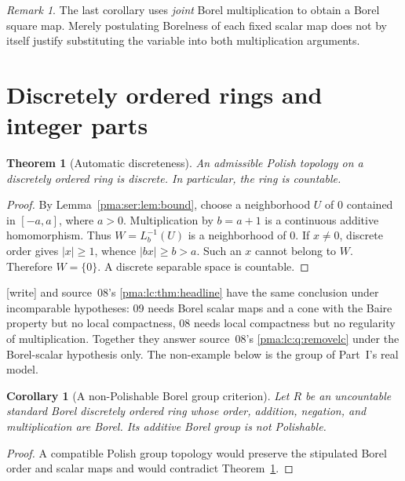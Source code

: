 \documentclass[11pt]{article}
\numberwithin{equation}{section}
\newtheorem{theorem}{Theorem}[section]
\newtheorem{corollary}[corollary]{Corollary}
\theoremstyle{definition}
\theoremstyle{remark}
\newtheorem{remark}[remark]{Remark}
\newcommand{\writetag}{\textup{\textsf{\small[write]}}}
\begin{document}
\begin{remark}
The last corollary uses \emph{joint} Borel multiplication to obtain a Borel
square map. Merely postulating Borelness of each fixed scalar map does not by
itself justify substituting the variable into both multiplication arguments.
\end{remark}

\section{Discretely ordered rings and integer parts}
\label{pma:ser:sec:rings}

\begin{theorem}[Automatic discreteness]\label{pma:ser:thm:discrete}
An admissible Polish topology on a discretely ordered ring is discrete.
In particular, the ring is countable.
\end{theorem}
\begin{proof}
By Lemma~\ref{pma:ser:lem:bound}, choose a neighborhood $U$ of $0$ contained in
$[-a,a]$, where $a>0$. Multiplication by $b=a+1$ is a continuous additive
homomorphism. Thus $W=L_b^{-1}(U)$ is a neighborhood of $0$.
If $x\ne0$, discrete order gives $|x|\geq1$, whence
$|bx|\geq b>a$. Such an $x$ cannot belong to $W$. Therefore $W=\{0\}$.
A discrete separable space is countable.
\end{proof}

\noindent\writetag{}  and source~08's
\cref{pma:lc:thm:headline} have the same conclusion under incomparable
hypotheses: 09 needs Borel scalar maps and a cone with the Baire property but
no local compactness, 08 needs local compactness but no regularity of
multiplication. Together they answer source~08's \cref{pma:lc:q:removelc} under
the Borel-scalar hypothesis only. The non-example below is the group of
Part~I's real model.

\begin{corollary}[A non-Polishable Borel group criterion]\label{pma:ser:cor:ringborel}
Let $R$ be an uncountable standard Borel discretely ordered ring whose order,
addition, negation, and multiplication are Borel. Its additive Borel group is
not Polishable.
\end{corollary}
\begin{proof}
A compatible Polish group topology would preserve the stipulated Borel order
and scalar maps and would contradict Theorem~\ref{pma:ser:thm:discrete}.
\end{proof}
\end{document}
